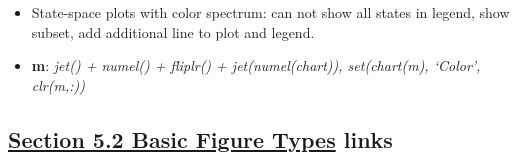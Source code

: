\documentclass[
]{book}
\providecommand{\tightlist}{%
  \setlength{\itemsep}{0pt}\setlength{\parskip}{0pt}}
\begin{document}
\begin{enumerate}
  \begin{itemize}
  \tightlist
  \item
    State-space plots with color spectrum: can not show all states in legend, show subset, add additional line to plot and legend.
  \item
    \textbf{m}: \emph{jet() + numel() + fliplr() + jet(numel(chart)), set(chart(m), `Color', clr(m,:))}
  \end{itemize}
\end{enumerate}

\hypertarget{section-5.2-basic-figure-typesbasic-figure-types-links}{%
\subsection{\texorpdfstring{\protect\hyperlink{basic-figure-types}{Section 5.2 Basic Figure Types} links}{Section 5.2 Basic Figure Types links}}\label{section-5.2-basic-figure-typesbasic-figure-types-links}}
\end{document}
